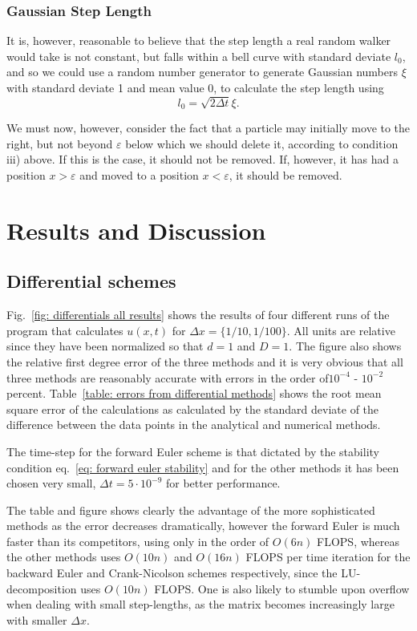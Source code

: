 \documentclass[twoside, 11pt]{article}
\begin{document}
		\subsubsection{Gaussian Step Length}
			It is, however, reasonable to believe that the step length a real random walker would take is not constant, but falls within a bell curve with standard deviate $l_0$, and so we could use a random number generator to generate Gaussian numbers $\xi$ with standard deviate 1 and mean value 0, to calculate the step length using $$l_0 = \sqrt{2\Delta t}\xi.$$
			
			We must now, however, consider the fact that a particle may initially move to the right, but not beyond $\varepsilon$ below which we should delete it, according to condition iii) above. If this is the case, it should not be removed. If, however, it has had a position $x>\varepsilon$ and moved to a position $x<\varepsilon$, it should be removed. 
			
	
\section{Results and Discussion}
	\subsection{Differential schemes}
		Fig.~\ref{fig: differentials all results} shows the results of four different runs of the program that calculates $u(x, t)$ for $\Delta x= \{1/10, 1/100\}$. All units are relative since they have been normalized so that $d=1$ and $D = 1$. The figure also shows the relative first degree error of the three methods and it is very obvious that all three methods are reasonably accurate with errors in the order of$10^{-4}$ - $10^{-2}$ percent. Table~\ref{table: errors from differential methods} shows the root mean square error of the calculations as calculated by the standard deviate of the difference between the data points in the analytical and numerical methods.
		
		The time-step for the forward Euler scheme is that dictated by the stability condition eq.~\eqref{eq: forward euler stability} and for the other methods it has been chosen very small, $\Delta t = 5\cdot 10^{-9}$ for better performance. 
		
		The table and figure shows clearly the advantage of the more sophisticated methods as the error decreases dramatically, however the forward Euler is much faster than its competitors, using only in the order of $O(6n)$ FLOPS, whereas the other methods uses $O(10n)$ and $O(16n)$ FLOPS per time iteration for the backward Euler and Crank-Nicolson schemes respectively, since the LU-decomposition uses $O(10n)$ FLOPS\cite{project1}. One is also likely to stumble upon overflow when dealing with small step-lengths, as the matrix becomes increasingly large with smaller $\Delta x$.
\end{document}
